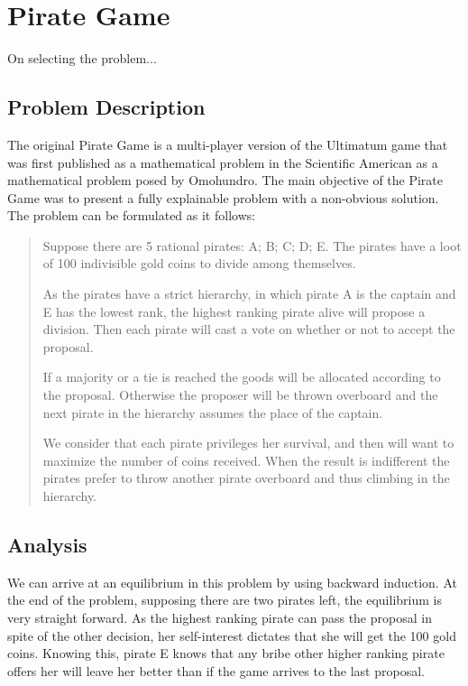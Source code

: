 


\section{Pirate Game}
\label{sec:pirate}

\begin{emph}
On selecting the problem...
\end{emph}


\subsection{Problem Description}
\label{subsec:description}

The original Pirate Game is a multi-player version of the Ultimatum game that was first published as a mathematical problem in the Scientific American as a mathematical problem posed by Omohundro\cite{Stewart1999}. The main objective of the Pirate Game was to present a fully explainable problem with a non-obvious solution. The problem can be formulated as it follows:

\begin{quotation}
Suppose there are 5 rational pirates: A; B; C; D; E. The pirates have a  loot of 100 indivisible gold coins to divide among themselves.


As the pirates have a strict hierarchy, in which pirate A is the captain and E has the lowest rank, the highest ranking pirate alive will propose a division. Then each pirate will cast a vote on whether or not to accept the proposal. 

If a majority or a tie is reached the goods will be allocated according to the proposal. Otherwise the proposer will be thrown overboard and the next pirate in the hierarchy assumes the place of the captain. 

We consider that each pirate privileges her survival, and then will want to maximize the number of coins received. When the result is indifferent the pirates prefer to throw another pirate overboard and thus climbing in the hierarchy. 
\end{quotation}

\subsection{Analysis}
\label{subsec:analysis_PG}

We can arrive at an equilibrium in this problem by using backward induction. At the end of the problem, supposing there are two pirates left, the equilibrium is very straight forward. As the highest ranking pirate can pass the proposal in spite of the other decision, her self-interest dictates that she will get the 100 gold coins. Knowing this, pirate E knows that any bribe other higher ranking pirate offers her will leave her better than if the game arrives to the last proposal. 

